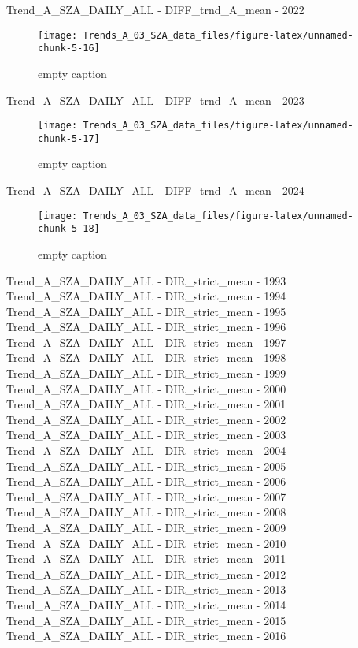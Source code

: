 \documentclass[
  10pt,
  a4paper,oneside]{article}
\begin{document}
Trend\_A\_SZA\_DAILY\_ALL - DIFF\_trnd\_A\_mean - 2022

\begin{figure}[!ht]

{\centering \texttt{[image: Trends\_A\_03\_SZA\_data\_files/figure-latex/unnamed-chunk-5-16]} 

}

\caption{ empty caption }\label{fig:unnamed-chunk-5-16}
\end{figure}

Trend\_A\_SZA\_DAILY\_ALL - DIFF\_trnd\_A\_mean - 2023

\begin{figure}[!ht]

{\centering \texttt{[image: Trends\_A\_03\_SZA\_data\_files/figure-latex/unnamed-chunk-5-17]} 

}

\caption{ empty caption }\label{fig:unnamed-chunk-5-17}
\end{figure}

Trend\_A\_SZA\_DAILY\_ALL - DIFF\_trnd\_A\_mean - 2024

\begin{figure}[!ht]

{\centering \texttt{[image: Trends\_A\_03\_SZA\_data\_files/figure-latex/unnamed-chunk-5-18]} 

}

\caption{ empty caption }\label{fig:unnamed-chunk-5-18}
\end{figure}

Trend\_A\_SZA\_DAILY\_ALL - DIR\_strict\_mean - 1993
Trend\_A\_SZA\_DAILY\_ALL - DIR\_strict\_mean - 1994
Trend\_A\_SZA\_DAILY\_ALL - DIR\_strict\_mean - 1995
Trend\_A\_SZA\_DAILY\_ALL - DIR\_strict\_mean - 1996
Trend\_A\_SZA\_DAILY\_ALL - DIR\_strict\_mean - 1997
Trend\_A\_SZA\_DAILY\_ALL - DIR\_strict\_mean - 1998
Trend\_A\_SZA\_DAILY\_ALL - DIR\_strict\_mean - 1999
Trend\_A\_SZA\_DAILY\_ALL - DIR\_strict\_mean - 2000
Trend\_A\_SZA\_DAILY\_ALL - DIR\_strict\_mean - 2001
Trend\_A\_SZA\_DAILY\_ALL - DIR\_strict\_mean - 2002
Trend\_A\_SZA\_DAILY\_ALL - DIR\_strict\_mean - 2003
Trend\_A\_SZA\_DAILY\_ALL - DIR\_strict\_mean - 2004
Trend\_A\_SZA\_DAILY\_ALL - DIR\_strict\_mean - 2005
Trend\_A\_SZA\_DAILY\_ALL - DIR\_strict\_mean - 2006
Trend\_A\_SZA\_DAILY\_ALL - DIR\_strict\_mean - 2007
Trend\_A\_SZA\_DAILY\_ALL - DIR\_strict\_mean - 2008
Trend\_A\_SZA\_DAILY\_ALL - DIR\_strict\_mean - 2009
Trend\_A\_SZA\_DAILY\_ALL - DIR\_strict\_mean - 2010
Trend\_A\_SZA\_DAILY\_ALL - DIR\_strict\_mean - 2011
Trend\_A\_SZA\_DAILY\_ALL - DIR\_strict\_mean - 2012
Trend\_A\_SZA\_DAILY\_ALL - DIR\_strict\_mean - 2013
Trend\_A\_SZA\_DAILY\_ALL - DIR\_strict\_mean - 2014
Trend\_A\_SZA\_DAILY\_ALL - DIR\_strict\_mean - 2015
Trend\_A\_SZA\_DAILY\_ALL - DIR\_strict\_mean - 2016
\end{document}
